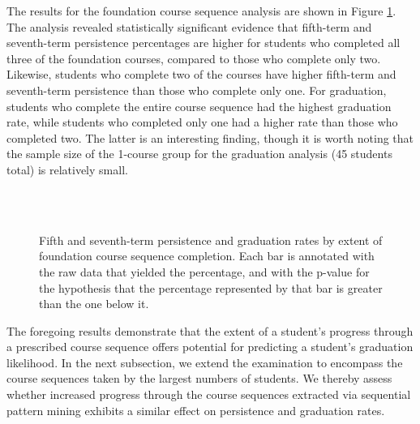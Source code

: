 \documentclass[conference]{IEEEtran}
\begin{document}
The results for the foundation course sequence analysis are shown in Figure \ref{core_pathway_outcomes}.  The analysis revealed statistically significant evidence that fifth-term and seventh-term persistence percentages are higher for students who completed all three of the foundation courses, compared to those who complete only two.  Likewise, students who complete two of the courses have higher fifth-term and seventh-term persistence than those who complete only one.  For graduation, students who complete the entire course sequence had the highest graduation rate, while students who completed only one had a higher rate than those who completed two. The latter is an interesting finding, though it is worth noting that the sample size of the 1-course group for the graduation analysis (45 students total) is relatively small.   
\begin{figure}[htbp]
    \centering
    \\
    \\
    \caption{Fifth and seventh-term persistence and graduation rates by extent of foundation course sequence completion.  Each bar is annotated with the raw data that yielded the percentage, and with the p-value for the hypothesis that the percentage represented by that bar is greater than the one below it.}
    \label{core_pathway_outcomes}
\end{figure}

The foregoing results demonstrate that the extent of a student's progress through a prescribed course sequence offers potential for predicting a student's graduation likelihood.  In the next subsection, we extend the examination to encompass the course sequences taken by the largest numbers of students.   We thereby assess whether increased progress through the course sequences extracted via sequential pattern mining exhibits a similar effect on persistence and graduation rates. 
\end{document}
